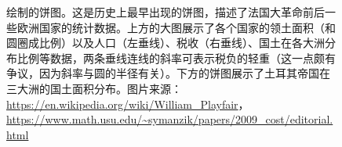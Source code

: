 \documentclass[
  b5paper,
  UTF8,twoside]{book}
\begin{document}
\begin{figure}

{\centering {}\newline{}\newline

}

\caption[William Playfair 的饼图 ]{\citet{Playfair01} 绘制的饼图。这是历史上最早出现的饼图，描述了法国大革命前后一些欧洲国家的统计数据。上方的大图展示了各个国家的领土面积（和圆圈成比例）以及人口（左垂线）、税收（右垂线）、国土在各大洲分布比例等数据，两条垂线连线的斜率可表示税负的轻重（这一点颇有争议，因为斜率与圆的半径有关）。下方的饼图展示了土耳其帝国在三大洲的国土面积分布。图片来源：\url{https://en.wikipedia.org/wiki/William_Playfair}，\url{https://www.math.usu.edu/~symanzik/papers/2009_cost/editorial.html}}\label{fig:playfair01}
\end{figure}
\end{document}
